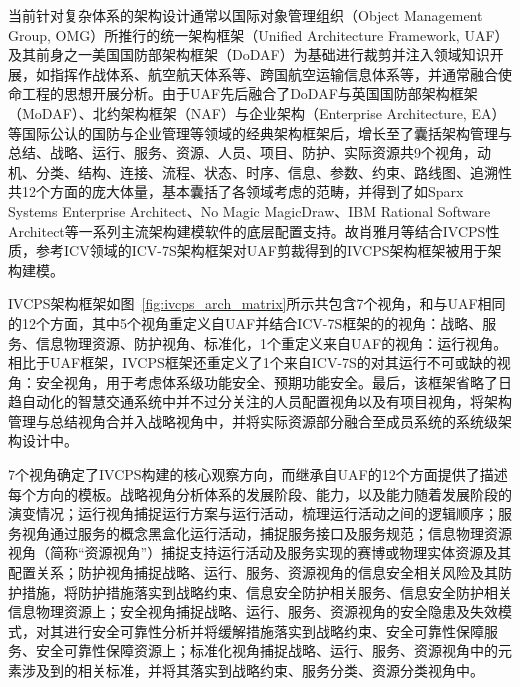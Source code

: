       当前针对复杂体系的架构设计通常以国际对象管理组织（Object Management Group, OMG）所推行的统一架构框架（Unified Architecture Framework, UAF）\cite{hause2020uafple,hause2021securityviews,hause2021serviceviews}及其前身之一美国国防部架构框架（DoDAF）为基础进行裁剪\cite{abhaya2021ubm}并注入领域知识开展，如指挥作战体系\cite{qianqunyou2024uafurbancombat,lvweimin2021dodaf,cuiruijing2025uafindicator,lidelin2024uafcooperation}、航空航天体系等\cite{liminghua2021aerospace,huangran2024lunarserviceuaf}、跨国航空运输信息体系\cite{lisong2022uafairtransportation}等，并通常融合使命工程的思想开展分析\cite{wanglinyao2024missionengineeringreview,shiyujing2024missiontaskeval}。由于UAF先后融合了DoDAF与英国国防部架构框架（MoDAF）、北约架构框架（NAF）与企业架构（Enterprise Architecture, EA）等国际公认的国防与企业管理等领域的经典架构框架后，增长至了囊括架构管理与总结、战略、运行、服务、资源、人员、项目、防护、实际资源共9个视角，动机、分类、结构、连接、流程、状态、时序、信息、参数、约束、路线图、追溯性共12个方面的庞大体量，基本囊括了各领域考虑的范畴，并得到了如Sparx Systems Enterprise Architect、No Magic MagicDraw、IBM Rational Software Architect等一系列主流架构建模软件的底层配置支持。故肖雅月等\cite{qixiaojing2026mbsose}结合IVCPS性质，参考ICV领域的ICV-7S架构框架对UAF剪裁得到的IVCPS架构框架被用于架构建模。

      IVCPS架构框架如图~\ref{fig:ivcps_arch_matrix}所示共包含7个视角，和与UAF相同的12个方面，其中5个视角重定义自UAF并结合ICV-7S框架的的视角：战略、服务、信息物理资源、防护视角、标准化，1个重定义来自UAF的视角：运行视角。相比于UAF框架，IVCPS框架还重定义了1个来自ICV-7S的对其运行不可或缺的视角：安全视角，用于考虑体系级功能安全、预期功能安全。最后，该框架省略了日趋自动化的智慧交通系统中并不过分关注的人员配置视角以及有项目视角，将架构管理与总结视角合并入战略视角中，并将实际资源部分融合至成员系统的系统级架构设计中。

      7个视角确定了IVCPS构建的核心观察方向，而继承自UAF的12个方面提供了描述每个方向的模板。战略视角分析体系的发展阶段、能力，以及能力随着发展阶段的演变情况；运行视角捕捉运行方案与运行活动，梳理运行活动之间的逻辑顺序；服务视角通过服务的概念黑盒化运行活动，捕捉服务接口及服务规范；信息物理资源视角（简称“资源视角”）捕捉支持运行活动及服务实现的赛博或物理实体资源及其配置关系；防护视角捕捉战略、运行、服务、资源视角的信息安全相关风险及其防护措施，将防护措施落实到战略约束、信息安全防护相关服务、信息安全防护相关信息物理资源上；安全视角捕捉战略、运行、服务、资源视角的安全隐患及失效模式，对其进行安全可靠性分析并将缓解措施落实到战略约束、安全可靠性保障服务、安全可靠性保障资源上；标准化视角捕捉战略、运行、服务、资源视角中的元素涉及到的相关标准，并将其落实到战略约束、服务分类、资源分类视角中。 

